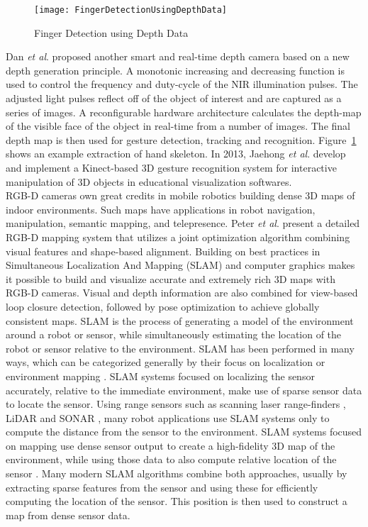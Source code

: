 \begin{figure}[b]
\centering
\texttt{[image: FingerDetectionUsingDepthData]}
\caption{Finger Detection using Depth Data \cite{NIRGesture14}}
\label{FingerDetectionUsingDepthData}
\end{figure}%
Dan \textit{et al}. \cite{NIRGesture14} proposed another smart and real-time depth camera based on a new depth generation principle. A monotonic increasing and decreasing function is used to control the frequency and duty-cycle of the NIR illumination pulses. The adjusted light pulses reflect off of the object of interest and are captured as a series of images. A reconfigurable hardware architecture calculates the depth-map of the visible face of the object in real-time from a number of images. The final depth map is then used for gesture detection, tracking and recognition. Figure~\ref{FingerDetectionUsingDepthData} shows an example extraction of hand skeleton. In 2013, Jaehong \textit{et al}. \cite{InteractiveManipulation_2013} develop and implement a Kinect-based 3D gesture recognition system for interactive
manipulation of 3D objects in educational visualization softwares. 
\\\indent%
%
RGB-D cameras own great credits in mobile robotics building dense 3D maps of indoor environments. Such maps have applications in robot navigation, manipulation, semantic mapping, and telepresence. Peter \textit{et al}. \cite{indorMappingRGBD_2014} present a detailed RGB-D mapping system that utilizes a joint optimization algorithm combining visual features and shape-based alignment. Building on best practices in Simultaneous Localization And Mapping (SLAM) and computer graphics makes it possible to build and visualize accurate and extremely rich 3D maps with RGB-D cameras. Visual and depth information are also combined for view-based loop closure detection, followed by pose optimization to achieve globally consistent maps. SLAM is the process of generating a model of the environment around a robot or sensor, while simultaneously estimating the location of the robot or sensor relative to the environment. SLAM has been performed in many ways, which can be categorized generally by their focus on localization or environment mapping \cite{SLAMintro_2015}. SLAM systems focused on localizing the sensor accurately, relative to the immediate environment, make use of sparse sensor data to locate the sensor. Using range sensors such as scanning laser range-finders \cite{laserSLAM_2011}, LiDAR and SONAR \cite{sonarSLAM_2013}, many robot applications use SLAM systems only to compute the distance from the sensor to the environment. SLAM systems focused on mapping use dense sensor output to create a high-fidelity 3D map of the environment, while using those data to also compute relative location of the sensor \cite{KinectFusion_2011, mapSLAM_2013}. Many modern SLAM algorithms combine both approaches, usually by extracting sparse features from the sensor and using these for efficiently computing the location of the sensor. This position is then used to construct a map from dense sensor data. 
